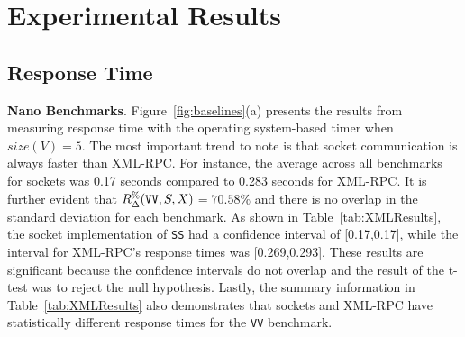 \documentclass{sig-alternate}
\begin{document}
\vspace*{-.1in}
\section{Experimental Results}
\label{sec:results}

\subsection{Response Time}
\label{sec:time-overhead}




{\bf Nano Benchmarks}. Figure~\ref{fig:baselines}(a) presents the
results from measuring response time with the operating system-based
timer when $size(V)=5$.  The most important trend to note is that
socket communication is always faster than XML-RPC.  For instance, the
average across all benchmarks for sockets was 0.17 seconds compared to
0.283 seconds for XML-RPC.  It is further evident that {\small
  $R_\Delta^\%(\mbox{{\tt VV}},S,X)$}$ = 70.58\%$ and there is no
overlap in the standard deviation for each benchmark. As shown in
Table~\ref{tab:XMLResults}, the socket implementation of \texttt{SS}
had a confidence interval of [0.17,0.17], while the interval for
XML-RPC's response times was [0.269,0.293].  These results are
significant because the confidence intervals do not overlap and the
result of the t-test was to reject the null hypothesis.  Lastly, the
summary information in Table~\ref{tab:XMLResults} also demonstrates
that sockets and XML-RPC have statistically different response times
for the \texttt{VV} benchmark.

\end{document}
